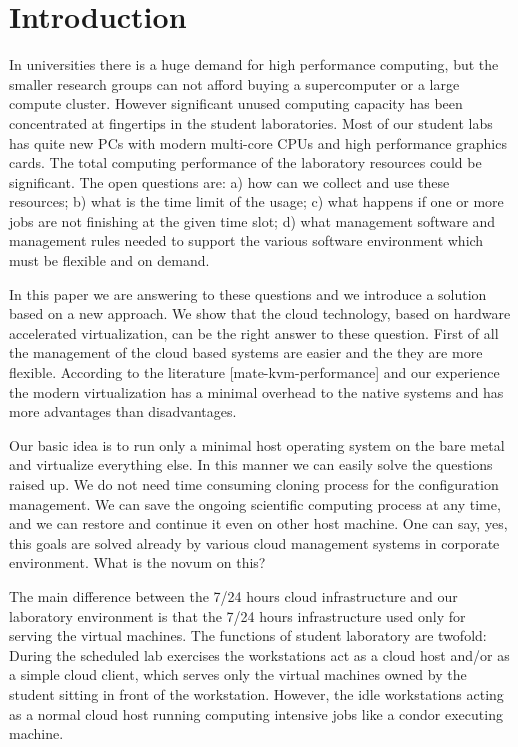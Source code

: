 \documentclass{llncs}
\begin{document}
\section{Introduction}
In universities there is a huge demand for high performance computing, but the smaller research groups can not afford buying a supercomputer or a large compute cluster. However significant unused computing capacity has been concentrated at fingertips in the student laboratories. Most of our student labs has quite new PCs with modern multi-core CPUs and high performance graphics cards. The total computing performance of the laboratory resources could be significant. The open questions are: a) how can we collect and use these resources; b) what is the time limit of the usage; c) what happens if one or more jobs are not finishing at the given time slot; d) what management software and management rules needed to support the various software environment which must be flexible and on demand. 

In this paper we are answering to these questions and we introduce a solution based on a new approach. We show that the cloud technology, based on hardware accelerated virtualization, can be the right answer to these question. First of all the management of the cloud based systems are easier and the they are more flexible. According to the literature [mate-kvm-performance] and our experience the modern virtualization has a minimal overhead to the native systems and has more advantages than disadvantages.

Our basic idea is to run only a minimal host operating system on the bare metal and virtualize everything else. In this manner we can easily solve the questions raised up. We do not need time consuming cloning process for the configuration management. We can save the ongoing scientific computing process at any time, and we can restore and continue it  even on other host machine.  One can say, yes, this goals are solved already by various cloud management systems in corporate environment. What is the novum on this? 

The main difference between the 7/24 hours cloud infrastructure and our laboratory environment is that the 7/24 hours infrastructure used only for serving the virtual machines.  The functions of student laboratory are twofold:  During the scheduled lab exercises the workstations act as a cloud host and/or  as a simple cloud client, which serves only the virtual machines owned by the student sitting in front of the workstation. 
However, the idle workstations acting as a normal cloud host running computing intensive jobs like a condor executing machine. 
\end{document}
